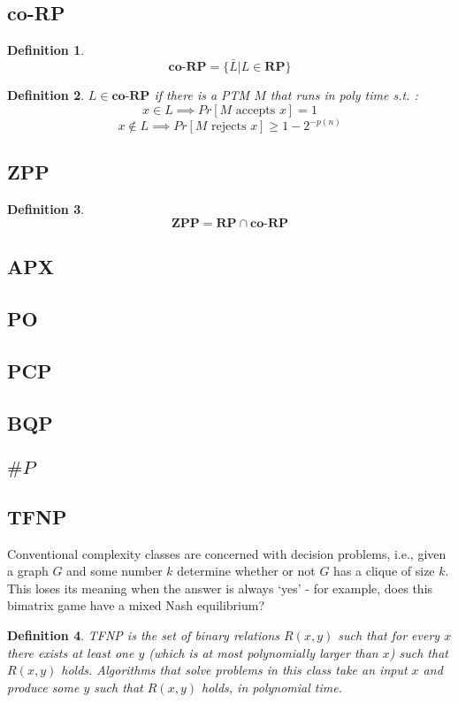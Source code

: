 \documentclass[]{article}
\theoremstyle{break}
\theoremstyle{break}
\newtheorem{definition}{Definition}[section]
\begin{document}
\subsection{co-RP}
\label{sec:co-rp}
\begin{definition}
	$$\textbf{co-RP} = \{\bar{L}| L\in \hyperref[sec:rp]{\textbf{RP}} \}$$
\end{definition}
\begin{definition}
	$L\in \textbf{co-RP}$ if there is a PTM $M$ that runs in poly time s.t. :
	$$x \in L \implies 	Pr[M \text{ accepts } x] = 1$$
	$$x \notin L \implies 	Pr[M \text{ rejects } x] \geq 1 - 2^{-p(n)}$$
\end{definition}
\subsection{ZPP}
\label{sec:zpp}
\begin{definition}
	$$\textbf{ZPP} = \hyperref[sec:rp]{\textbf{RP}} \cap \hyperref[sec:co-rp]{\textbf{co-RP}}$$
\end{definition}

\subsection{APX}

\subsection{PO}

\subsection{PCP}

\subsection{BQP}

\subsection{$\# P$}

\subsection{TFNP}
Conventional complexity classes are concerned with decision problems, i.e., given a graph $G$ and some number $k$ determine whether or not $G$ has a clique of size $k$.\\
This loses its meaning when the answer is always `yes' - for example, does this bimatrix game have a mixed Nash equilibrium?\\
\begin{definition}
	TFNP is the set of binary relations $R(x, y)$ such that for every $x$ there exists at least one $y$ (which is at most polynomially larger than $x$) such that $R(x,y)$ holds.
	Algorithms that solve problems in this class take an input $x$ and produce some $y$ such that $R(x, y)$ holds, in polynomial time.
\end{definition}
\end{document}
